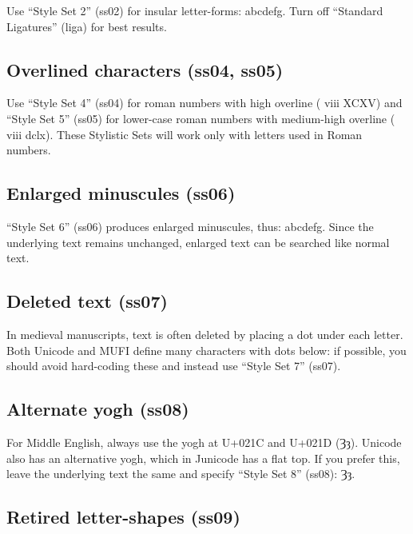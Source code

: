 \documentclass[12pt,a4paper,openany]{book}
\begin{document}
Use “Style Set 2” (ss02) for insular letter-forms:
{ abcdefg.} Turn off “Standard
Ligatures” (liga) for best results.

\subsection*{Overlined characters (ss04, ss05)}

Use “Style Set 4” (ss04) for roman numbers with high overline
({ viii XCXV}) and “Style Set 5”
(ss05) for lower-case roman numbers with medium-high overline
({ viii dclx}). These Stylistic
Sets will work only with letters used in Roman numbers.

\subsection*{Enlarged minuscules (ss06)}

“Style Set 6” (ss06) produces enlarged minuscules, thus:
{ abcdefg.} Since the underlying
text remains unchanged, enlarged text can be searched like normal
text.

\subsection*{Deleted text (ss07)}

In medieval manuscripts, text is often deleted by placing a dot under each
letter. Both Unicode and MUFI define many characters with dots below:
{ if possible, you should avoid
hard-coding these and instead use} “Style Set 7” (ss07).

\subsection*{Alternate yogh (ss08)}

For Middle English, always use the yogh at U+021C and U+021D (Ȝȝ).
Unicode also has an alternative yogh, which in Junicode has a
flat top. If you prefer this, leave the underlying text the same and
specify “Style Set 8” (ss08):
{ Ȝȝ}.


\subsection*{Retired letter-shapes (ss09)}
\end{document}
